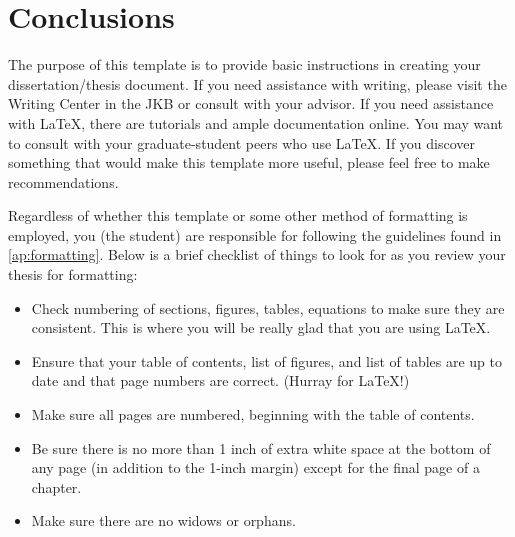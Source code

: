 \chapter{Conclusions}

The purpose of this template is to provide basic instructions in creating your 
dissertation/thesis document. If you need assistance with writing, please visit the
Writing Center in the JKB or consult with your advisor. If you need assistance with
\LaTeX, there are tutorials and ample documentation online. You may want to consult
with your graduate-student peers who use \LaTeX. If you discover something that would
make this template more useful, please feel free to make recommendations.

Regardless of whether this template or some other method of formatting is employed, 
you (the student) are responsible for following the guidelines found in \cref{ap:formatting}. 
Below is a brief checklist of things to look for as you review your thesis for formatting:
\begin{itemize}
	\item Check numbering of sections, figures, tables, equations to make sure they are consistent.	This is where you will be really glad that you are using \LaTeX.
	\item Ensure that your table of contents, list of figures, and list of tables are up to date and that page numbers are correct. (Hurray for \LaTeX!)
	\item Make sure all pages are numbered, beginning with the table of contents.
	\item Be sure there is no more than 1 inch of extra white space at the bottom of any page (in addition to the 1-inch margin) except for the final page of a chapter.
	\item Make sure there are no widows or orphans.
\end{itemize}

